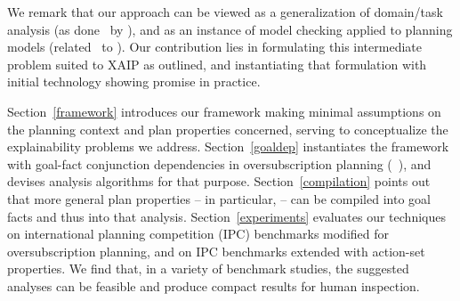 We remark that our approach can be viewed as a generalization of
domain/task analysis (as done \eg\ by \cite{fox:long:jair-98}), and as
an instance of model checking applied to planning models (related
\eg\ to \cite{vaquero:etal:keq-13}). Our contribution lies in
formulating this intermediate problem suited to XAIP as outlined, and
instantiating that formulation with initial technology showing promise
in practice.
%
%

%
Section~\ref{framework} introduces our framework making minimal
assumptions on the planning context and plan properties concerned,
serving to conceptualize the explainability problems we
address. Section~\ref{goaldep} instantiates the framework with
goal-fact conjunction dependencies in oversubscription planning
(\eg\ \cite{smith:icaps-04,domshlak:mirkis:jair-15}), and devises
analysis algorithms for that purpose. Section~\ref{compilation} points
out that more general plan properties -- in particular,
 -- can be compiled into goal facts and
thus into that analysis. Section~\ref{experiments} evaluates our
techniques on international planning competition (IPC) benchmarks
modified for oversubscription planning, and on IPC benchmarks extended
with action-set properties. 
%
%
We find that, in a variety of benchmark studies, the suggested
analyses can be feasible and produce compact results for human
inspection.

